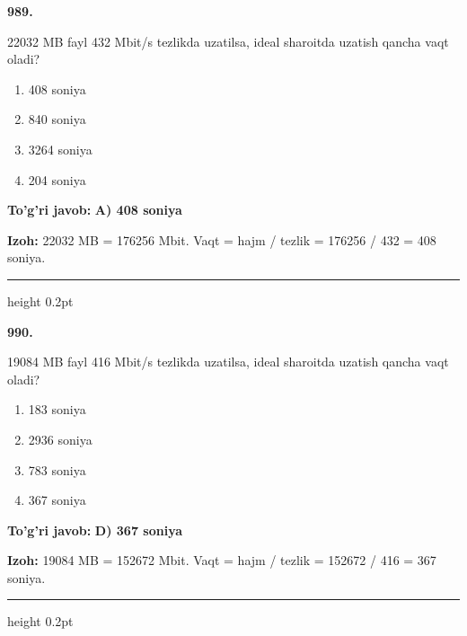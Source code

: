 \documentclass[10pt,a4paper,oneside]{article}
\begin{document}
\noindent\textbf{\color{ink}989.}
\par
22032 MB fayl 432 Mbit/s tezlikda uzatilsa, ideal sharoitda uzatish qancha vaqt oladi?
\begin{enumerate}[label=\Alph*),leftmargin=9mm]
\item 408 soniya
\item 840 soniya
\item 3264 soniya
\item 204 soniya
\end{enumerate}
\begin{tcolorbox}[enhanced,breakable,colback=teal!4,colframe=teal!50!black,boxrule=0.5pt,arc=1.1mm,left=3mm,right=3mm,top=1.7mm,bottom=1.7mm,before skip=2mm,after skip=2mm]
\textbf{\color{teal}To'g'ri javob:} \textbf{A) 408 soniya}
\par\smallskip
\textbf{Izoh:} 22032 MB = 176256 Mbit. Vaqt = hajm / tezlik = 176256 / 432 = 408 soniya.
\end{tcolorbox}
\vspace{2mm}\hrule height 0.2pt \vspace{3mm}

\noindent\textbf{\color{ink}990.}
\par
19084 MB fayl 416 Mbit/s tezlikda uzatilsa, ideal sharoitda uzatish qancha vaqt oladi?
\begin{enumerate}[label=\Alph*),leftmargin=9mm]
\item 183 soniya
\item 2936 soniya
\item 783 soniya
\item 367 soniya
\end{enumerate}
\begin{tcolorbox}[enhanced,breakable,colback=teal!4,colframe=teal!50!black,boxrule=0.5pt,arc=1.1mm,left=3mm,right=3mm,top=1.7mm,bottom=1.7mm,before skip=2mm,after skip=2mm]
\textbf{\color{teal}To'g'ri javob:} \textbf{D) 367 soniya}
\par\smallskip
\textbf{Izoh:} 19084 MB = 152672 Mbit. Vaqt = hajm / tezlik = 152672 / 416 = 367 soniya.
\end{tcolorbox}
\vspace{2mm}\hrule height 0.2pt \vspace{3mm}
\end{document}
